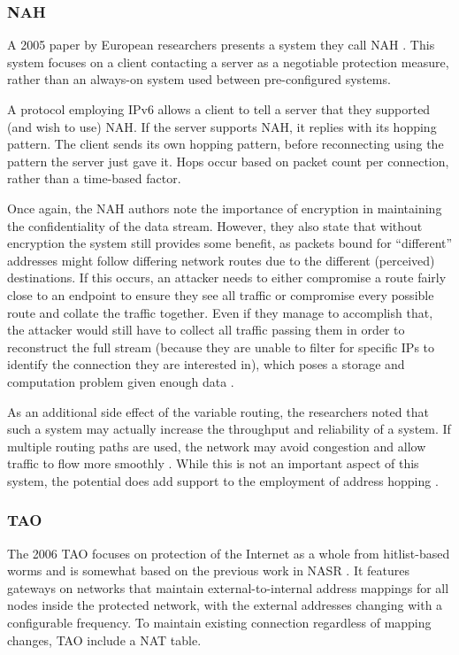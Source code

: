 \subsubsection{\acf{NAH}}
\par A 2005 paper by European researchers presents a system they call \acf{NAH} \cite{NAH}. This system focuses on a client contacting a server as a negotiable protection measure, rather than an always-on system used between pre-configured systems.

\par A protocol employing \ac{IPv6} allows a client to tell a server that they supported (and wish to use) \ac{NAH}. If the server supports NAH, it replies with its hopping pattern. The client sends its own hopping pattern, before reconnecting using the pattern the server just gave it. Hops occur based on packet count per connection, rather than a time-based factor.

\par Once again, the NAH authors note the importance of encryption in maintaining the confidentiality of the data stream. However, they also state that without encryption the system still provides some benefit, as packets bound for ``different'' addresses might follow differing network routes due to the different (perceived) destinations. If this occurs, an attacker needs to either compromise a route fairly close to an endpoint to ensure they see all traffic or compromise every possible route and collate the traffic together. Even if they manage to accomplish that, the attacker would still have to collect all traffic passing them in order to reconstruct the full stream (because they are unable to filter for specific \acp{IP} to identify the connection they are interested in), which poses a storage and computation problem given enough data \cite{NAH}.

\par As an additional side effect of the variable routing, the researchers noted that such a system may actually increase the throughput and reliability of a system. If multiple routing paths are used, the network may avoid congestion and allow traffic to flow more smoothly \cite{MultimediaDistributed}. While this is not an important aspect of this system, the potential does add support to the employment of address hopping \cite{NAH}.

\subsubsection{\acf{TAO}}
\par The 2006 \ac{TAO} focuses on protection of the Internet as a whole from hitlist-based worms and is somewhat based on the previous work in \ac{NASR} \cite{NASR}. It features gateways on networks that maintain external-to-internal address mappings for all nodes inside the protected network, with the external addresses changing with a configurable frequency. To maintain existing connection regardless of mapping changes, TAO include a \ac{NAT} table. 

